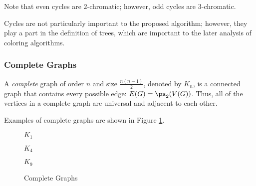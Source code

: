 Note that even cycles are \(2\)-chromatic; however, odd cycles are \(3\)-chromatic.

Cycles are not particularly important to the proposed algorithm; however, they play a part in the definition of
trees, which are important to the later analysis of coloring algorithms.

\subsubsection{Complete Graphs}

A \emph{complete} graph of order \(n\) and size \(\frac{n(n-1)}{2}\), denoted by \(K_n\), is a connected graph that
contains every possible edge: \(E(G)=\ps_2(V(G))\).  Thus, all of the vertices in a complete graph are universal and
adjacent to each other.

Examples of complete graphs are shown in Figure \ref{fig:complete}.

\begin{figure}[h]
  \label{fig:complete}
  \begin{minipage}{2in}
    \begin{center}

      \bigskip

      \(K_1\)
    \end{center}
  \end{minipage}
  \begin{minipage}{2in}
    \begin{center}

      \bigskip

      \(K_4\)
    \end{center}
  \end{minipage}
  \begin{minipage}{2in}
    \begin{center}

      \bigskip

      \(K_9\)
    \end{center}
  \end{minipage}
  \caption{Complete Graphs}
\end{figure}

